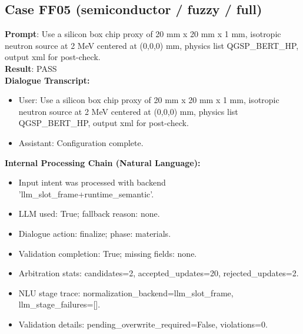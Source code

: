 \documentclass[11pt]{ctexart}
\begin{document}
\subsection{Case FF05 (semiconductor / fuzzy / full)}
\textbf{Prompt}: Use a silicon box chip proxy of 20 mm x 20 mm x 1 mm, isotropic neutron source at 2 MeV centered at (0,0,0) mm, physics list QGSP\_BERT\_HP, output xml for post-check.\\
\textbf{Result}: PASS\\
\textbf{Dialogue Transcript:}
\begin{itemize}
\item User: Use a silicon box chip proxy of 20 mm x 20 mm x 1 mm, isotropic neutron source at 2 MeV centered at (0,0,0) mm, physics list QGSP\_BERT\_HP, output xml for post-check.
\item Assistant: Configuration complete.
\end{itemize}
\textbf{Internal Processing Chain (Natural Language):}
\begin{itemize}
\item Input intent was processed with backend 'llm\_slot\_frame+runtime\_semantic'.
\item LLM used: True; fallback reason: none.
\item Dialogue action: finalize; phase: materials.
\item Validation completion: True; missing fields: none.
\item Arbitration stats: candidates=2, accepted\_updates=20, rejected\_updates=2.
\item NLU stage trace: normalization\_backend=llm\_slot\_frame, llm\_stage\_failures=[].
\item Validation details: pending\_overwrite\_required=False, violations=0.
\end{itemize}
\end{document}
